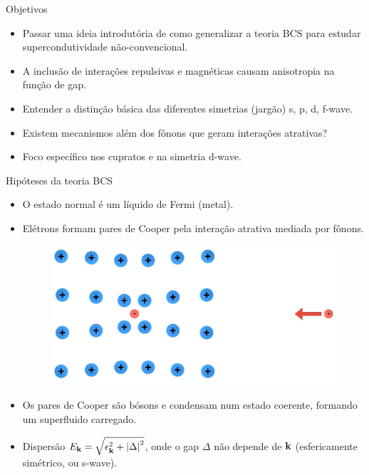 \documentclass[aspectratio=169,xcolor={table,dvipsnames,usenames}]{beamer}
\begin{document}
\begin{frame}{Objetivos}

\begin{itemize}
\item Passar uma ideia introdutória de como generalizar a teoria BCS para estudar supercondutividade não-convencional.

\n\n

\item A inclusão de interações repulsivas e magnéticas causam anisotropia na função de gap.

\n\n

\item Entender a distinção básica das diferentes simetrias (jargão) s, p, d, f-wave.

\n\n

\item Existem mecanismos além dos fônons que geram interações atrativas?

\n\n

\item Foco específico nos cupratos e na simetria d-wave.
\end{itemize}



\end{frame}

\begin{frame}{Hipóteses da teoria BCS}

\begin{itemize}
\item O estado normal é um líquido de Fermi (metal).

\item Elétrons formam pares de Cooper pela interação atrativa mediada por fônons.

\n

\begin{figure}[H]
\centering
\includegraphics[width=0.5\linewidth]{fig/phonon.png}
\label{fig:phonon}
\end{figure}

\n

\item Os pares de Cooper são bósons e condensam num estado coerente, formando um superfluido carregado.

\item Dispersão $E_{\vb{k}} = \sqrt{\epsilon_{\vb{k}}^2 + \abs{\Delta}^2}$, onde o gap $\Delta$ não depende de $\vb{k}$ (esfericamente simétrico, ou s-wave).
\end{itemize}

\end{frame}
\end{document}
